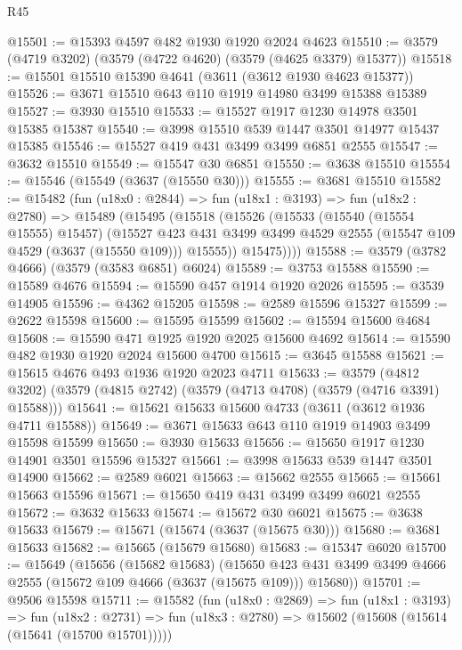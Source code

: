 \begin{lexlean}{R45}
\begin{coremodule}
@15501 := @15393 @4597 @482 @1930 @1920 @2024 @4623
@15510 := @3579 (@4719 @3202) (@3579 (@4722 @4620) (@3579 (@4625 @3379) @15377))
@15518 := @15501 @15510 @15390 @4641 (@3611 (@3612 @1930 @4623 @15377))
@15526 := @3671 @15510 @643 @110 @1919 @14980 @3499 @15388 @15389
@15527 := @3930 @15510
@15533 := @15527 @1917 @1230 @14978 @3501 @15385 @15387
@15540 := @3998 @15510 @539 @1447 @3501 @14977 @15437 @15385
@15546 := @15527 @419 @431 @3499 @3499 @6851 @2555
@15547 := @3632 @15510
@15549 := @15547 @30 @6851
@15550 := @3638 @15510
@15554 := @15546 (@15549 (@3637 (@15550 @30)))
@15555 := @3681 @15510
@15582 := @15482
    (fun (u18x0 : @2844) =>
    fun (u18x1 : @3193) =>
    fun (u18x2 : @2780) =>
    @15489
      (@15495
        (@15518
          (@15526
            (@15533
              (@15540 (@15554 @15555) @15457)
              (@15527
                @423
                @431
                @3499
                @3499
                @4529
                @2555
                (@15547 @109 @4529 (@3637 (@15550 @109)))
                @15555))
            @15475))))
@15588 := @3579 (@3782 @4666) (@3579 (@3583 @6851) @6024)
@15589 := @3753 @15588
@15590 := @15589 @4676
@15594 := @15590 @457 @1914 @1920 @2026
@15595 := @3539 @14905
@15596 := @4362 @15205
@15598 := @2589 @15596 @15327
@15599 := @2622 @15598
@15600 := @15595 @15599
@15602 := @15594 @15600 @4684
@15608 := @15590 @471 @1925 @1920 @2025 @15600 @4692
@15614 := @15590 @482 @1930 @1920 @2024 @15600 @4700
@15615 := @3645 @15588
@15621 := @15615 @4676 @493 @1936 @1920 @2023 @4711
@15633 := @3579
    (@4812 @3202)
    (@3579 (@4815 @2742) (@3579 (@4713 @4708) (@3579 (@4716 @3391) @15588)))
@15641 := @15621 @15633 @15600 @4733 (@3611 (@3612 @1936 @4711 @15588))
@15649 := @3671 @15633 @643 @110 @1919 @14903 @3499 @15598 @15599
@15650 := @3930 @15633
@15656 := @15650 @1917 @1230 @14901 @3501 @15596 @15327
@15661 := @3998 @15633 @539 @1447 @3501 @14900
@15662 := @2589 @6021
@15663 := @15662 @2555
@15665 := @15661 @15663 @15596
@15671 := @15650 @419 @431 @3499 @3499 @6021 @2555
@15672 := @3632 @15633
@15674 := @15672 @30 @6021
@15675 := @3638 @15633
@15679 := @15671 (@15674 (@3637 (@15675 @30)))
@15680 := @3681 @15633
@15682 := @15665 (@15679 @15680)
@15683 := @15347 @6020
@15700 := @15649
    (@15656
      (@15682 @15683)
      (@15650 @423 @431 @3499 @3499 @4666 @2555 (@15672 @109 @4666 (@3637 (@15675 @109))) @15680))
@15701 := @9506 @15598
@15711 := @15582
    (fun (u18x0 : @2869) =>
    fun (u18x1 : @3193) =>
    fun (u18x2 : @2731) => fun (u18x3 : @2780) => @15602 (@15608 (@15614 (@15641 (@15700 @15701)))))

\end{coremodule}
\end{lexlean}
